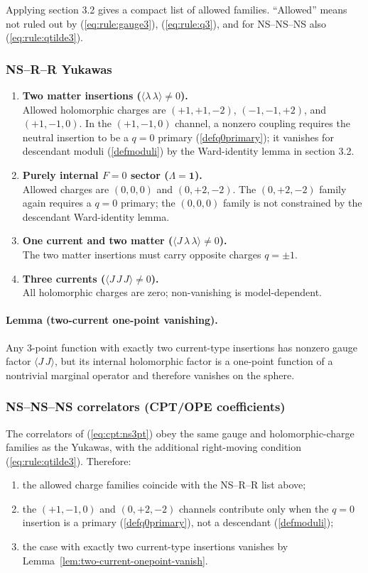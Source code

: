 \documentclass[12pt]{article}
\begin{document}
Applying section 3.2 gives a compact list of allowed families. ``Allowed'' means not ruled out by (\ref{eq:rule:gauge3}), (\ref{eq:rule:q3}), and for NS--NS--NS also (\ref{eq:rule:qtilde3}).

\subsubsection*{NS--R--R Yukawas}
\begin{enumerate}
\item {\bf Two matter insertions ($\langle\lambda\,\lambda\rangle\neq 0$).}\\
Allowed holomorphic charges are $(+1,+1,-2)$, $(-1,-1,+2)$, and $(+1,-1,0)$. In the $(+1,-1,0)$ channel, a nonzero coupling requires the neutral insertion to be a $q=0$ primary (\ref{defq0primary}); it vanishes for descendant moduli (\ref{defmoduli}) by the Ward-identity lemma in section 3.2.
\item {\bf Purely internal $F=0$ sector ($\Lambda=\mathbf{1}$).}\\
Allowed charges are $(0,0,0)$ and $(0,+2,-2)$. The $(0,+2,-2)$ family again requires a $q=0$ primary; the $(0,0,0)$ family is not constrained by the descendant Ward-identity lemma.
\item {\bf One current and two matter ($\langle J\,\lambda\,\lambda\rangle\neq 0$).}\\
The two matter insertions must carry opposite charges $q=\pm 1$.
\item {\bf Three currents ($\langle J\,J\,J\rangle\neq 0$).}\\
All holomorphic charges are zero; non-vanishing is model-dependent.
\end{enumerate}

\paragraph*{Lemma (two-current one-point vanishing).}\label{lem:two-current-onepoint-vanish}
Any 3-point function with exactly two current-type insertions has nonzero gauge factor $\langle J\,J\rangle$, but its internal holomorphic factor is a one-point function of a nontrivial marginal operator and therefore vanishes on the sphere.

\subsubsection*{NS--NS--NS correlators (CPT/OPE coefficients)}
The correlators of (\ref{eq:cpt:ns3pt}) obey the same gauge and holomorphic-charge families as the Yukawas, with the additional right-moving condition (\ref{eq:rule:qtilde3}). Therefore:
\begin{enumerate}
\item the allowed charge families coincide with the NS--R--R list above;
\item the $(+1,-1,0)$ and $(0,+2,-2)$ channels contribute only when the $q=0$ insertion is a primary (\ref{defq0primary}), not a descendant (\ref{defmoduli});
\item the case with exactly two current-type insertions vanishes by Lemma~\ref{lem:two-current-onepoint-vanish}.
\end{enumerate}
\end{document}
